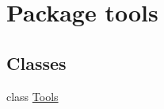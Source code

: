 \hypertarget{namespacetools}{\section{Package tools}
\label{namespacetools}
}
\subsection*{Classes}
\begin{DoxyCompactItemize}
\item 
class \hyperlink{classtools_1_1_tools}{Tools}
\end{DoxyCompactItemize}
